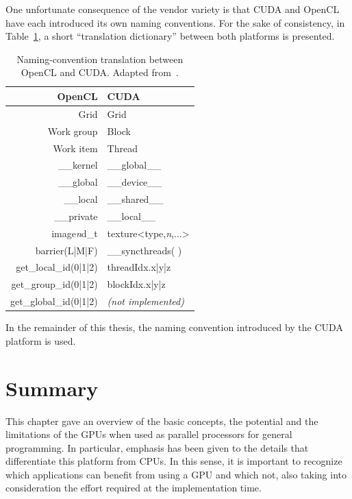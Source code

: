 One unfortunate consequence of the vendor variety is that CUDA and
OpenCL have each introduced its own naming conventions. For the sake
of consistency, in Table~\ref{tab:02-CUDA_OpenCL_translation}, a
short ``translation dictionary'' between both platforms is presented.

\begin{table}
\caption{Naming-convention translation between OpenCL and CUDA. Adapted from~\cite{Kloeckner_CUDA.OpenCL.dictionary:2011}.\label{tab:02-CUDA_OpenCL_translation}}


\centering

\begin{tabular}{r|l}
\hline 
\textbf{OpenCL} & \textbf{CUDA}\tabularnewline[\doublerulesep]
\hline 
Grid & Grid\tabularnewline
Work group & Block\tabularnewline
Work item & Thread\tabularnewline
\_\_kernel & \_\_global\_\_\tabularnewline
\_\_global & \_\_device\_\_\tabularnewline
\_\_local & \_\_shared\_\_\tabularnewline
\_\_private & \_\_local\_\_\tabularnewline
image\emph{n}d\_t & texture<type,\emph{n},...>\tabularnewline
barrier(L|M|F) & \_\_syncthreads( )\tabularnewline
get\_local\_id(0|1|2) & threadIdx.x|y|z\tabularnewline
get\_group\_id(0|1|2) & blockIdx.x|y|z\tabularnewline
get\_global\_id(0|1|2) & \emph{(not implemented)}\tabularnewline
\hline 
\end{tabular}
\end{table}


In the remainder of this thesis, the naming convention introduced
by the CUDA platform is used.


\section{Summary}

This chapter gave an overview of the basic concepts, the potential
and the limitations of the GPUs when used as parallel processors for
general programming. In particular, emphasis has been given to the
details that differentiate this platform from CPUs. In this sense,
it is important to recognize which applications can benefit from using
a GPU and which not, also taking into consideration the effort required
at the implementation time.
